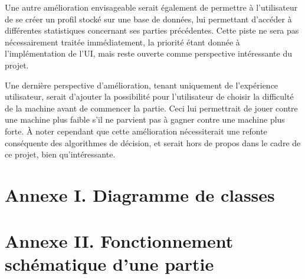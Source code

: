      Une autre amélioration envisageable serait également de permettre à l'utilisateur de se créer un profil stocké sur une base de données, lui permettant d'accéder à différentes statistiques concernant ses parties précédentes.
      Cette piste ne sera pas nécessairement traitée immédiatement, la priorité étant donnée à l'implémentation de l'UI\@, mais reste ouverte comme perspective intéressante du projet.

      Une dernière perspective d'amélioration, tenant uniquement de l'expérience utilisateur, serait d'ajouter la possibilité pour l'utilisateur de choisir la difficulté de la machine avant de commencer la partie.
      Ceci lui permettrait de jouer contre une machine plus faible s'il ne parvient pas à gagner contre une machine plus forte.
      À noter cependant que cette amélioration nécessiterait une refonte conséquente des algorithmes de décision, et serait hors de propos dans le cadre de ce projet, bien qu'intéressante.

\newpage

\section*{Annexe I. Diagramme de classes}

\newpage

\section*{Annexe II. Fonctionnement schématique d'une partie}
